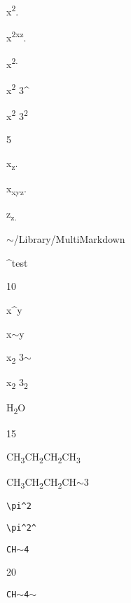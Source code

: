 
\def\mytitle{Superscript}


x\textsuperscript{2}.

x\textsuperscript{2xz}.

x\textsuperscript{2.}

x\textsuperscript{2} 3\^{}

x\textsuperscript{2} 3\textsuperscript{2}

5

x\textsubscript{z}.

x\textsubscript{xyz}.

z\textsubscript{z.}

\ensuremath{\sim}\slash Library\slash MultiMarkdown

\^{}test

10

x\^{}y

x\ensuremath{\sim}y

x\textsubscript{2} 3\ensuremath{\sim}

x\textsubscript{2} 3\textsubscript{2}

H\textsubscript{2}O

15

CH\textsubscript{3}CH\textsubscript{2}CH\textsubscript{2}CH\textsubscript{3}

CH\textsubscript{3}CH\textsubscript{2}CH\textsubscript{2}CH\ensuremath{\sim}3

\texttt{\textbackslash{}pi\^{}2}

\texttt{\textbackslash{}pi\^{}2\^{}}

\texttt{CH\ensuremath{\sim}4}

20

\texttt{CH\ensuremath{\sim}4\ensuremath{\sim}}




